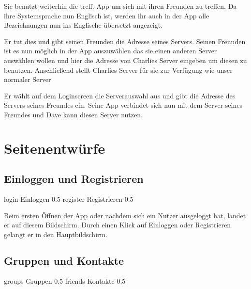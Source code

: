 \documentclass[parskip=full,11pt]{scrartcl}
\newcommand\producttitle{treff.}
\begin{document}
{Sie benutzt weiterhin die \producttitle-App um sich mit ihren Freunden zu treffen.}
{Da ihre Systemsprache nun Englisch ist, werden ihr auch in der App alle Bezeichnungen
nun ins Englische übersetzt angezeigt.}

{Er tut dies und gibt seinen Freunden die Adresse seines Servers.}
{Seinen Freunden ist es nun möglich in der App auszuwählen das sie einen anderen Server auswählen wollen und hier die Adresse von
Charlies Server eingeben um diesen zu benutzen. Anschließend stellt Charlies Server für sie zur Verfügung wie unser normaler Server}


{Er wählt auf dem Loginscreen die Serverauswahl aus und gibt die Adresse des Servers seines Freundes ein.}
{Seine App verbindet sich nun mit dem Server seines Freundes und Dave kann diesen Server nutzen.}

\pagebreak
\appendix

\section{Seitenentwürfe}

\subsection{Einloggen und Registrieren}
{login}
{Einloggen}
{0.5}
{register}
{Registrieren}
{0.5}

Beim ersten Öffnen der App oder nachdem sich ein Nutzer ausgeloggt hat, landet er auf diesem Bildschirm.
Durch einen Klick auf Einloggen oder Registrieren gelangt er in den Hauptbildschirm.

\pagebreak
\subsection{Gruppen und Kontakte}
{groups}
{Gruppen}
{0.5}
{friends}
{Kontakte}
{0.5}
\end{document}
